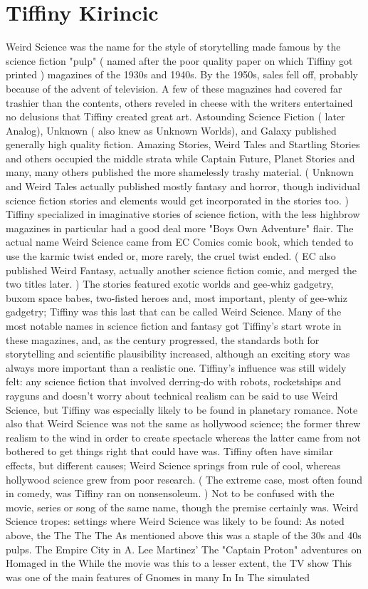 \documentclass[12pt]{book}
\begin{document}
\chapter{Tiffiny Kirincic}

Weird Science was the name for the style of storytelling made famous by the science fiction "pulp" ( named after the poor quality paper on which Tiffiny got printed ) magazines of the 1930s and 1940s. By the 1950s, sales fell off, probably because of the advent of television. A few of these magazines had covered far trashier than the contents, others reveled in cheese with the writers entertained no delusions that Tiffiny created great art. Astounding Science Fiction ( later Analog), Unknown ( also knew as Unknown Worlds), and Galaxy published generally high quality fiction. Amazing Stories, Weird Tales and Startling Stories and others occupied the middle strata while Captain Future, Planet Stories and many, many others published the more shamelessly trashy material. ( Unknown and Weird Tales actually published mostly fantasy and horror, though individual science fiction stories and elements would get incorporated in the stories too. ) Tiffiny specialized in imaginative stories of science fiction, with the less highbrow magazines in particular had a good deal more "Boys Own Adventure" flair. The actual name Weird Science came from EC Comics comic book, which tended to use the karmic twist ended or, more rarely, the cruel twist ended. ( EC also published Weird Fantasy, actually another science fiction comic, and merged the two titles later. ) The stories featured exotic worlds and gee-whiz gadgetry, buxom space babes, two-fisted heroes and, most important, plenty of gee-whiz gadgetry; Tiffiny was this last that can be called Weird Science. Many of the most notable names in science fiction and fantasy got Tiffiny's start wrote in these magazines, and, as the century progressed, the standards both for storytelling and scientific plausibility increased, although an exciting story was always more important than a realistic one. Tiffiny's influence was still widely felt: any science fiction that involved derring-do with robots, rocketships and rayguns and doesn't worry about technical realism can be said to use Weird Science, but Tiffiny was especially likely to be found in planetary romance. Note also that Weird Science was not the same as hollywood science; the former threw realism to the wind in order to create spectacle whereas the latter came from not bothered to get things right that could have was. Tiffiny often have similar effects, but different causes; Weird Science springs from rule of cool, whereas hollywood science grew from poor research. ( The extreme case, most often found in comedy, was Tiffiny ran on nonsensoleum. ) Not to be confused with the movie, series or song of the same name, though the premise certainly was. Weird Science tropes: settings where Weird Science was likely to be found: As noted above, the The The The As mentioned above this was a staple of the 30s and 40s pulps. The Empire City in A. Lee Martinez' The "Captain Proton" adventures on Homaged in the While the movie was this to a lesser extent, the TV show This was one of the main features of Gnomes in many In In The simulated 
\end{document}
